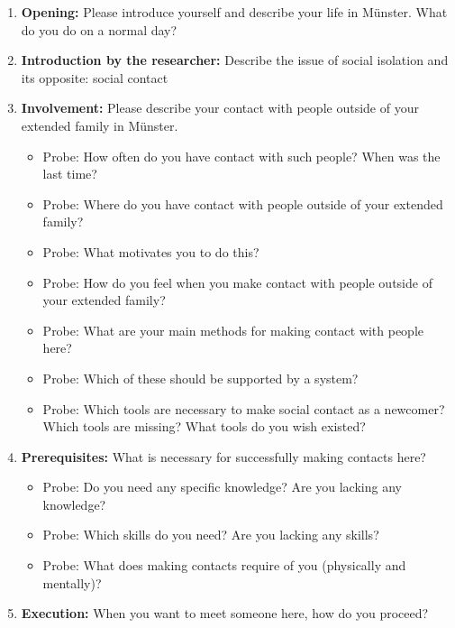 \begin{enumerate}
    \item \textbf{Opening:} Please introduce yourself and describe your life in Münster. What do you do on a normal day?\par\par

    \item \textbf{Introduction by the researcher:} Describe the issue of social isolation and its opposite: social contact

    \item \textbf{Involvement:} Please describe your contact with people outside of your extended family in Münster.

    \begin{itemize}
        \item Probe: How often do you have contact with such people? When was the last time?
        \item Probe: Where do you have contact with people outside of your extended family?
        \item Probe: What motivates you to do this?
        \item Probe: How do you feel when you make contact with people outside of your extended family?
        \item Probe: What are your main methods for making contact with people here?
        \item Probe: Which of these should be supported by a system?
        \item Probe: Which tools are necessary to make social contact as a newcomer? Which tools are missing? What tools do you wish existed?
    \end{itemize}

    \item \textbf{Prerequisites:} What is necessary for successfully making contacts here?

    \begin{itemize}
        \item Probe: Do you need any specific knowledge? Are you lacking any knowledge?
        \item Probe: Which skills do you need? Are you lacking any skills?
        \item Probe: What does making contacts require of you (physically and mentally)?
    \end{itemize}

    \item \textbf{Execution:} When you want to meet someone here, how do you proceed?


\end{enumerate}
